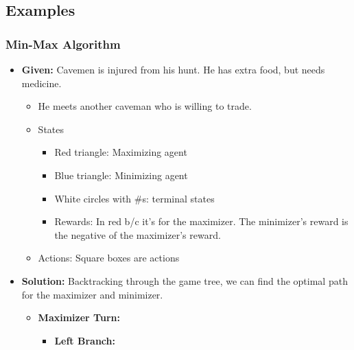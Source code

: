 \subsection{Examples}
\subsubsection{Min-Max Algorithm}
\begin{example}
    \begin{itemize}
        \item \textbf{Given:} Cavemen is injured from his hunt. He has extra food, but needs medicine.
        \begin{itemize}
            \item He meets another caveman who is willing to trade. 
        \end{itemize} 
        \vspace{-1.5em}
        \vspace{-1.5em}
        \begin{itemize}
            \item States
            \begin{itemize}
                \item Red triangle: Maximizing agent
                \item Blue triangle: Minimizing agent
                \item White circles with \#s: terminal states
                \item Rewards: In red b/c it's for the maximizer. The minimizer's reward is the negative of the maximizer's reward.
            \end{itemize}
            \item Actions: Square boxes are actions
        \end{itemize}
        \item \textbf{Solution:} Backtracking through the game tree, we can find the optimal path for the maximizer and minimizer.
        \begin{itemize}
            \item \textbf{Maximizer Turn:} 
            \begin{itemize}
                \item \textbf{Left Branch:}
                \begin{itemize}

\end{itemize}
\end{itemize}
\end{itemize}
\end{itemize}
\end{example}
